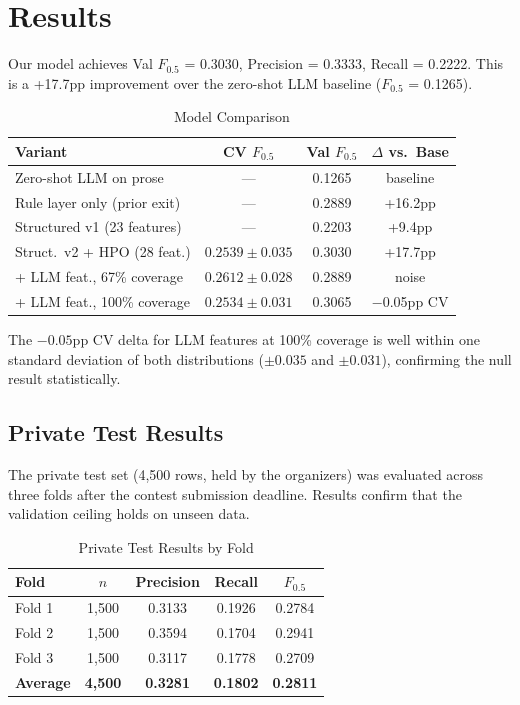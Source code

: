 \documentclass[10pt, conference]{IEEEtran}
\begin{document}
\section{Results}

Our model achieves Val $F_{0.5}$ = 0.3030, Precision = 0.3333, Recall = 0.2222. This is a +17.7pp improvement over the zero-shot LLM baseline ($F_{0.5}$ = 0.1265).

\begin{table}[h]
\centering
\caption{Model Comparison}
\label{tab:privatetest}
\begin{tabular}{@{}lccc@{}}
\toprule
\textbf{Variant} & \textbf{CV $F_{0.5}$} & \textbf{Val $F_{0.5}$} & \textbf{$\Delta$ vs.\ Base} \\
\midrule
Zero-shot LLM on prose          & ---                & 0.1265 & baseline     \\
Rule layer only (prior exit)    & ---                & 0.2889 & +16.2pp      \\
Structured v1 (23 features)     & ---                & 0.2203 & +9.4pp       \\
Struct.\ v2 + HPO (28 feat.)    & $0.2539 \pm 0.035$ & 0.3030 & +17.7pp      \\
+ LLM feat., 67\% coverage      & $0.2612 \pm 0.028$ & 0.2889 & noise        \\
+ LLM feat., 100\% coverage     & $0.2534 \pm 0.031$ & 0.3065 & $-$0.05pp CV \\
\bottomrule
\end{tabular}
\end{table}

The $-0.05$pp CV delta for LLM features at 100\% coverage is well within one standard deviation of both distributions ($\pm 0.035$ and $\pm 0.031$), confirming the null result statistically.

\subsection*{Private Test Results}

The private test set (4,500 rows, held by the organizers) was evaluated across three folds after the contest submission deadline. Results confirm that the validation ceiling holds on unseen data.

\begin{table}[h]
\caption{Private Test Results by Fold}
\label{tab:privatetest2}
\centering
\begin{tabular}{lcccc}
\hline
Fold & $n$ & Precision & Recall & $F_{0.5}$ \\
\hline
Fold 1 & 1,500 & 0.3133 & 0.1926 & 0.2784 \\
Fold 2 & 1,500 & 0.3594 & 0.1704 & 0.2941 \\
Fold 3 & 1,500 & 0.3117 & 0.1778 & 0.2709 \\
\textbf{Average} & \textbf{4,500} & \textbf{0.3281} & \textbf{0.1802} & \textbf{0.2811} \\
\hline
\end{tabular}
\end{table}
\end{document}
